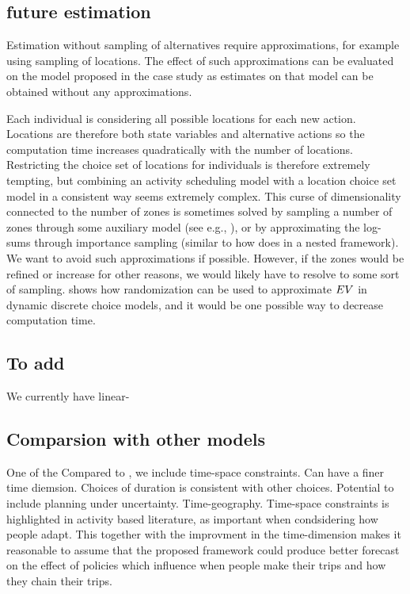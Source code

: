 \subsection{future estimation}
Estimation without sampling of alternatives require approximations, for example using sampling of locations. The effect of such approximations can be evaluated on the model proposed in the case study as estimates on that model can be obtained without any approximations. %

Each individual is considering all possible locations for each new action. Locations are therefore both state variables and alternative actions so the computation time increases quadratically with the number of locations. Restricting the choice set of locations for individuals is therefore extremely tempting, but combining an activity scheduling model with a location choice set model in a consistent way seems extremely complex. This curse of dimensionality connected to the number of zones is sometimes solved by sampling a number of zones through some auxiliary model (see e.g., \citep{liao2013incorporating}), or by approximating the log-sums through importance sampling (similar to how \citealt{bradley2010sacsim} does in a nested framework). We want to avoid such approximations if possible. However, if the zones would be refined or increase for other reasons, we would likely have to resolve to some sort of sampling. \citet{Rust97} shows how randomization can be used to approximate $EV$ in dynamic discrete choice models, and it would be one possible way to decrease computation time.

\subsection{To add}

We currently have linear-

\subsection{Comparsion with other models}

One of the 
Compared to \citet{bowman2001}, we include time-space constraints. Can have a finer time diemsion. Choices of duration is consistent with other choices. Potential to include planning under uncertainty. Time-geography.  
Time-space constraints is highlighted in activity based literature, as important when condsidering how people adapt. This together with the improvment in the time-dimension makes it reasonable to assume that the proposed framework could produce better forecast on the effect of policies which influence when people make their trips and how they chain their trips. 

